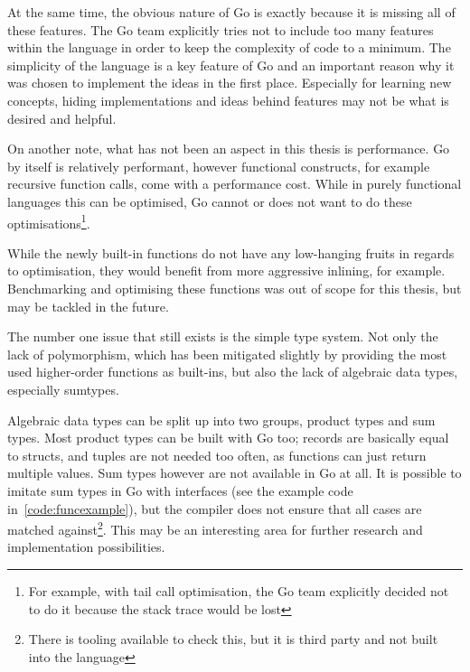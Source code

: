 At the same time, the obvious nature of Go is exactly because it is missing all
of these features. The Go team explicitly tries not to include too many features within
the language in order to keep the complexity of code to a minimum\autocite{go-feature}.
The simplicity of the language is a key feature of Go and an important reason why it was
chosen to implement the ideas in the first place.
Especially for learning new concepts, hiding implementations and ideas behind features
may not be what is desired and helpful.

On another note, what has not been an aspect in this thesis is
performance. Go by itself is relatively performant, however functional constructs, for example
recursive function calls, come with a performance cost. While in purely functional languages
this can be optimised, Go cannot or does not want to do these optimisations\footnote{For example,
with tail call optimisation, the Go team explicitly decided not to do it because the stack trace
would be lost\autocite{go-tco-nope}}.

While the newly built-in functions do not have any low-hanging fruits in regards to optimisation,
they would benefit from more aggressive inlining\autocite{go-compiler-inline}, for example.
Benchmarking and optimising these functions was out of scope for this thesis, but may be tackled
in the future.


The number one issue that still exists is the simple type system. Not only the lack of polymorphism, which
has been mitigated slightly by providing the most used higher-order functions as built-ins, but also the
lack of algebraic data types, especially \gls{sumtypes}.

Algebraic data types can be split up into two groups, product types and sum types.
Most product types can be built with Go too; records are basically
equal to structs, and tuples are not needed too often, as functions can just return multiple values.
Sum types however are not available in Go at all. It is possible to imitate sum types in Go
with interfaces (see the example code in~\ref{code:funcexample}), but the compiler does not ensure that
all cases are matched against\footnote{There is tooling available to check this\autocite{sushi-sumtypes},
	but it is third party and not built into the language}. This may be an interesting area for further
research and implementation possibilities.
